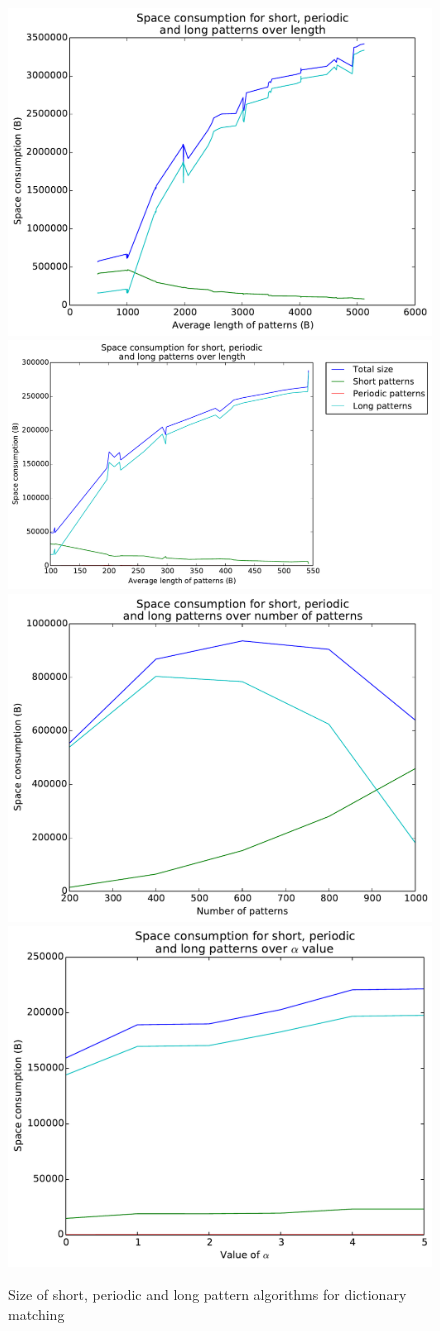 \documentclass[ %
                    author={Dominic Joseph Moylett},
                    degree={MEng},
                     title={Dictionary Matching with Fingerprints},
                  subtitle={An Empirical Analysis},
                      type={research},
                      year={2015} ]{dissertation}
\begin{document}
\begin{figure}[t]
\begin{center}
  \includegraphics[width=0.45\linewidth]{part_size_length_1000_10000}\includegraphics[width=0.55\linewidth]{part_size_length_200_1000}
  \includegraphics[width=0.5\linewidth]{part_size_num_200_1000}\includegraphics[width=0.5\linewidth]{part_size_alpha}
\end{center}
\caption{Size of short, periodic and long pattern algorithms for dictionary matching}
\label{fig:case-results}
\end{figure}
\end{document}
